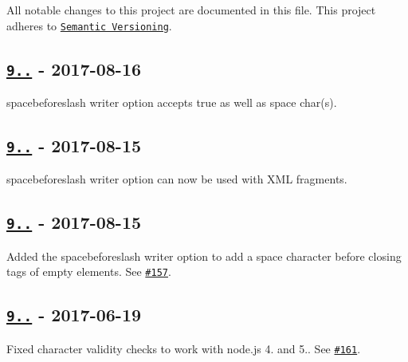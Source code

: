All notable changes to this project are documented in this file. This project adheres to \href{http://semver.org/#semantic-versioning-200}{\tt Semantic Versioning}.

\subsection*{\href{https://github.com/oozcitak/xmlbuilder-js/compare/v9.0.3...v9.0.4}{\tt 9..} -\/ 2017-\/08-\/16}


\begin{DoxyItemize}
\item {\ttfamily spacebeforeslash} writer option accepts {\ttfamily true} as well as space char(s).
\end{DoxyItemize}

\subsection*{\href{https://github.com/oozcitak/xmlbuilder-js/compare/v9.0.2...v9.0.3}{\tt 9..} -\/ 2017-\/08-\/15}


\begin{DoxyItemize}
\item {\ttfamily spacebeforeslash} writer option can now be used with X\+ML fragments.
\end{DoxyItemize}

\subsection*{\href{https://github.com/oozcitak/xmlbuilder-js/compare/v9.0.1...v9.0.2}{\tt 9..} -\/ 2017-\/08-\/15}


\begin{DoxyItemize}
\item Added the {\ttfamily spacebeforeslash} writer option to add a space character before closing tags of empty elements. See \href{https://github.com/oozcitak/xmlbuilder-js/issues/157}{\tt \#157}.
\end{DoxyItemize}

\subsection*{\href{https://github.com/oozcitak/xmlbuilder-js/compare/v9.0.0...v9.0.1}{\tt 9..} -\/ 2017-\/06-\/19}


\begin{DoxyItemize}
\item Fixed character validity checks to work with node.\+js 4. and 5.. See \href{https://github.com/oozcitak/xmlbuilder-js/issues/161}{\tt \#161}.
\end{DoxyItemize}

